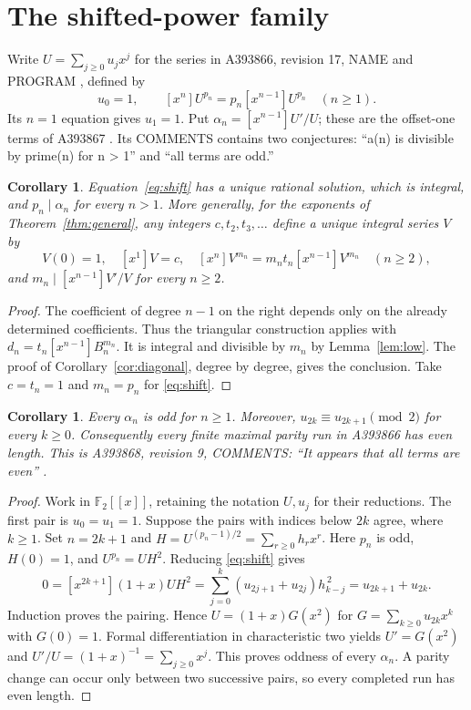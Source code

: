 \documentclass[11pt]{article}
\newtheorem{corollary}[theorem]{Corollary}
\newcommand{\coeff}[1]{[x^{#1}]}
\begin{document}
\section{The shifted-power family}\label{sec:shift}
Write $U=\sum_{j\ge0}u_jx^j$ for the series in A393866, revision 17,
NAME and PROGRAM \cite{shift}, defined by
\begin{equation}\label{eq:shift}
 u_0=1,\qquad
 \coeff nU^{p_n}=p_n\coeff{n-1}U^{p_n}\quad(n\ge1).
\end{equation}
Its $n=1$ equation gives $u_1=1$. Put
$\alpha_n=\coeff{n-1}U'/U$; these are the offset-one terms of
A393867 \cite{shiftlog}. Its COMMENTS contains two conjectures:
``a(n) is divisible by prime(n) for n > 1'' and ``all terms are odd.''

\begin{corollary}\label{cor:shift}
Equation~\eqref{eq:shift} has a unique rational solution, which is integral,
and $p_n\mid\alpha_n$ for every $n>1$.
More generally, for the exponents of Theorem~\ref{thm:general}, any
integers $c,t_2,t_3,\ldots$ define a unique integral series $V$ by
\[
 V(0)=1,\quad\coeff1V=c,\quad
 \coeff nV^{m_n}=m_nt_n\coeff{n-1}V^{m_n}\quad(n\ge2),
\]
and $m_n\mid\coeff{n-1}V'/V$ for every $n\ge2$.
\end{corollary}
\begin{proof}
The coefficient of degree $n-1$ on the right depends only on the
already determined coefficients. Thus the triangular construction applies
with $d_n=t_n\coeff{n-1}B_n^{m_n}$. It is integral and divisible by
$m_n$ by Lemma~\ref{lem:low}. The proof of
Corollary~\ref{cor:diagonal}, degree by degree, gives the conclusion.
Take $c=t_n=1$ and $m_n=p_n$ for \eqref{eq:shift}.
\end{proof}

\begin{corollary}\label{cor:odd}
Every $\alpha_n$ is odd for $n\ge1$. Moreover,
$u_{2k}\equiv u_{2k+1}\pmod2$ for every $k\ge0$.
Consequently every finite maximal parity run in A393866 has even length.
This is A393868, revision 9, COMMENTS: ``It appears that all terms
are even'' \cite{runs}.
\end{corollary}
\begin{proof}
Work in $\mathbb F_2[[x]]$, retaining the notation $U,u_j$ for their
reductions. The first pair is $u_0=u_1=1$. Suppose the pairs with
indices below $2k$ agree, where $k\ge1$. Set $n=2k+1$ and
$H=U^{(p_n-1)/2}=\sum_{r\ge0}h_rx^r$. Here $p_n$ is odd,
$H(0)=1$, and $U^{p_n}=UH^2$. Reducing \eqref{eq:shift} gives
\[
 0=\coeff{2k+1}(1+x)UH^2
   =\sum_{j=0}^k(u_{2j+1}+u_{2j})h_{k-j}^{\,2}
   =u_{2k+1}+u_{2k}.
\]
Induction proves the pairing. Hence $U=(1+x)G(x^2)$ for
$G=\sum_{k\ge0}u_{2k}x^k$ with $G(0)=1$. Formal differentiation
in characteristic two yields $U'=G(x^2)$ and
$U'/U=(1+x)^{-1}=\sum_{j\ge0}x^j$. This proves oddness of
every $\alpha_n$. A parity change can occur only between two successive
pairs, so every completed run has even length.
\end{proof}
\end{document}
